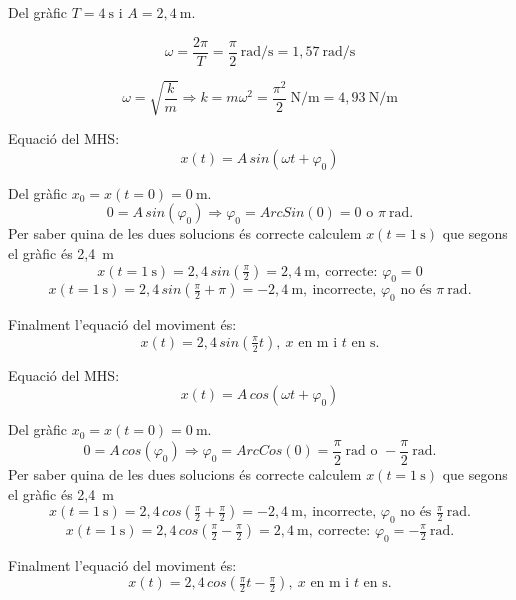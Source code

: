 \begin{solapartat}

 Del gràfic $T = 4\ \mathrm{s}$ i $A = 2,4\ \mathrm{m}$.

 \[ \omega = \frac{2\pi}{T} = \frac{\pi}{2}\ \mathrm{rad/s} = 1,57\ \mathrm{rad/s} \]

 \[ \omega = \sqrt{\frac{k}{m}} \Rightarrow k = m\omega^2 = \frac{\pi^2}{2}\ \mathrm{N/m} = 4,93\ \mathrm{N/m} \]


 Equació del MHS:
\[ x(t) = A\,sin(\omega t + \varphi_0) \]

 Del gràfic $x_0 = x(t{=}0) = 0\ \mathrm{m}$.
\[ 0 = A\,sin(\varphi_0) \Rightarrow \varphi_0 = ArcSin(0) = 0 \text{ o } \pi\ \mathrm{rad}. \]
Per saber quina de les dues solucions és correcte calculem $x(t{=}1\ \mathrm{s})$ que segons el gràfic és 2,4~m
\[ x(t = 1\ \mathrm{s}) = 2,4\,sin\left(\tfrac{\pi}{2}\right) = 2,4\ \mathrm{m},\ \text{correcte: } \varphi_0 = 0 \]
\[ x(t = 1\ \mathrm{s}) = 2,4\,sin\left(\tfrac{\pi}{2} + \pi\right) = -2,4\ \mathrm{m},\ \text{incorrecte, } \varphi_0 \text{ no és } \pi\ \mathrm{rad}. \]

 Finalment l'equació del moviment és:
\[ x(t) = 2,4\,sin\left(\tfrac{\pi}{2}t\right),\ x \text{ en m i } t \text{ en s.} \]


 Equació del MHS:
\[ x(t) = A\,cos(\omega t + \varphi_0) \]

 Del gràfic $x_0 = x(t{=}0) = 0\ \mathrm{m}$.
\[ 0 = A\,cos(\varphi_0) \Rightarrow \varphi_0 = ArcCos(0) = \frac{\pi}{2}\ \mathrm{rad} \text{ o } -\frac{\pi}{2}\ \mathrm{rad}. \]
Per saber quina de les dues solucions és correcte calculem $x(t{=}1\ \mathrm{s})$ que segons el gràfic és 2,4~m
\[ x(t = 1\ \mathrm{s}) = 2,4\,cos\left(\tfrac{\pi}{2} + \tfrac{\pi}{2}\right) = -2,4\ \mathrm{m},\ \text{incorrecte, } \varphi_0 \text{ no és } \tfrac{\pi}{2}\ \mathrm{rad}. \]
\[ x(t = 1\ \mathrm{s}) = 2,4\,cos\left(\tfrac{\pi}{2} - \tfrac{\pi}{2}\right) = 2,4\ \mathrm{m},\ \text{correcte: } \varphi_0 = -\tfrac{\pi}{2}\ \mathrm{rad}. \]

 Finalment l'equació del moviment és:
\[ x(t) = 2,4\,cos\left(\tfrac{\pi}{2}t - \tfrac{\pi}{2}\right),\ x \text{ en m i } t \text{ en s.} \]
\end{solapartat}

